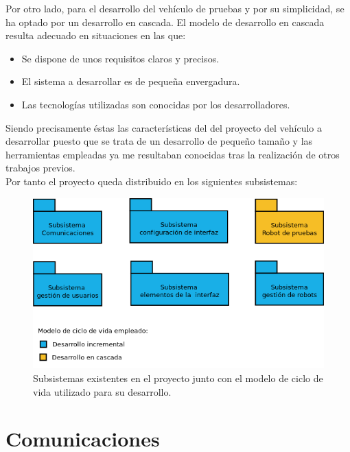 \documentclass[a4paper,12pt]{article}
\begin{document}
Por otro lado, para el desarrollo del vehículo de pruebas y por su simplicidad, se ha optado por un desarrollo en cascada. El modelo de desarrollo en cascada resulta adecuado en situaciones
en las que:\\

\begin{itemize}
 \item Se dispone de unos requisitos claros y precisos.
 \item El sistema a desarrollar es de pequeña envergadura.
 \item Las tecnologías utilizadas son conocidas por los desarrolladores.
\end{itemize}

Siendo precisamente éstas las características del del proyecto del vehículo a desarrollar puesto que se trata de un desarrollo de pequeño tamaño y las herramientas empleadas ya me resultaban conocidas
tras la realización de otros trabajos previos.\\

Por tanto el proyecto queda distribuido en los siguientes subsistemas:\\

\begin{figure}[H]
  \begin{center}
    \includegraphics[scale=.6]{imagenes/subsistemas.png}
  \end{center}
  \caption{Subsistemas existentes en el proyecto junto con el modelo de ciclo de vida
utilizado para su desarrollo.}
  \label{website:pagina-principal}
\end{figure}



\section{ Comunicaciones }
\end{document}
